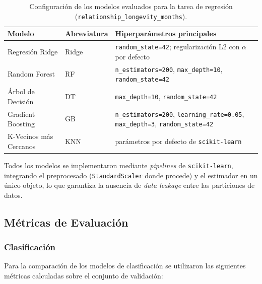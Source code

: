 \begin{table}[H]
\centering
\footnotesize
\begin{tabular}{llp{8cm}}
\hline
\textbf{Modelo} & \textbf{Abreviatura} & \textbf{Hiperparámetros principales} \\ \hline
Regresión Ridge & Ridge & \texttt{random\_state=42}; regularización L2 con $\alpha$ por defecto \\
Random Forest & RF & \texttt{n\_estimators=200}, \texttt{max\_depth=10}, \texttt{random\_state=42} \\
Árbol de Decisión & DT & \texttt{max\_depth=10}, \texttt{random\_state=42} \\
Gradient Boosting & GB & \texttt{n\_estimators=200}, \texttt{learning\_rate=0.05}, \texttt{max\_depth=3}, \texttt{random\_state=42} \\
K-Vecinos más Cercanos & KNN & parámetros por defecto de \texttt{scikit-learn} \\ \hline
\end{tabular}
\caption{Configuración de los modelos evaluados para la tarea de regresión (\texttt{relationship\_longevity\_months}).}
\label{tab:modelos_regresion}
\end{table}

Todos los modelos se implementaron mediante \textit{pipelines} de \texttt{scikit-learn}, integrando el preprocesado (\texttt{StandardScaler} donde procede) y el estimador en un único objeto, lo que garantiza la ausencia de \textit{data leakage} entre las particiones de datos.

\subsection{Métricas de Evaluación}
\label{subsec:metricas_evaluacion}

\subsubsection{Clasificación}
Para la comparación de los modelos de clasificación se utilizaron las siguientes métricas calculadas sobre el conjunto de validación:

